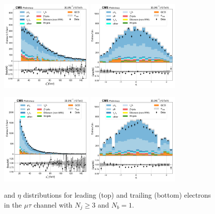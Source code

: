\begin{figure}[htb!]
    \centering
    \includegraphics[width=0.4\textwidth]{chapters/Appendix/sectionPlots/figures/data_mc_overlays/mutau_2016_cat_gt3_eq1_signal_linear_lepton_lepton1_pt}
    \includegraphics[width=0.4\textwidth]{chapters/Appendix/sectionPlots/figures/data_mc_overlays/mutau_2016_cat_gt3_eq1_signal_linear_lepton_lepton1_eta}

    \includegraphics[width=0.4\textwidth]{chapters/Appendix/sectionPlots/figures/data_mc_overlays/mutau_2016_cat_gt3_eq1_signal_linear_lepton_lepton2_pt}
    \includegraphics[width=0.4\textwidth]{chapters/Appendix/sectionPlots/figures/data_mc_overlays/mutau_2016_cat_gt3_eq1_signal_linear_lepton_lepton2_eta}
    \caption{\pt and $\eta$ distributions for leading (top) and trailing
        (bottom) electrons in the $\mu\tau$ channel with $N_{j} \geq 3$ and
        $N_{b} = 1$.}
    \label{fig:mutau_7_kinematic}
\end{figure}

